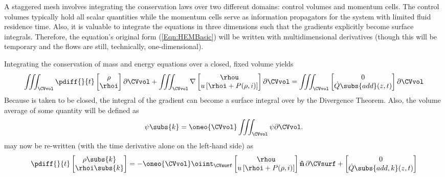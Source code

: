 A staggered mesh involves integrating the conservation laws over two different domains: control volumes and momentum cells.
The control volumes typically hold all scalar quantities while the momentum cells serve as information propagators for the system with limited fluid residence time.
Also, it is valuable to integrate the equations in three dimensions such that the gradients explicitly become surface integrals.
Therefore, the equation's original form (\cref{Eqn:HEMBasic}) will be written with multidimensional derivatives (though this will be temporary and the flows are still, technically, one-dimensional).

Integrating the conservation of mass and energy equations over a closed, fixed volume \CVvol yields
\begin{equation}
    \iiint_{\CVvol}\pdiff{}{t}\begin{bmatrix}
                   \rho \\
                   \rhoi 
                \end{bmatrix}\partial\CVvol
    + 
    \iiint_{\CVvol}\mathbf{\nabla}\begin{bmatrix}
                    \rhou                 \\
                    u\left[\rhoi  + P(\rho,i)\right]
                \end{bmatrix}\partial\CVvol
             =  
    \iiint_{\CVvol}\begin{bmatrix}
        0 \\%
        \dot{Q}\subs{add}(z,t)
    \end{bmatrix}\partial\CVvol
    \label{Eqn:HEMBasic3D}
\end{equation}
Because \CVvol is taken to be closed, the integral of the gradient can become a surface integral over \CVsurf by the Divergence Theorem.
Also, the volume average of some quantity \psi will be defined as
\begin{equation}
    \psi\subs{k} = \oneo{\CVvol}\iiint_{\CVvol}\psi \partial\CVvol.
    \label{Eqn:VolumeAveragedQuantity}
\end{equation}
 may now be re-written (with the time derivative alone on the left-hand side) as 
\begin{equation}
                \pdiff{}{t}\begin{bmatrix}
                   \rho\subs{k} \\
                   \rhoi\subs{k} 
                \end{bmatrix}
    = -  
    \oneo{\CVvol}
                \oiint_{\CVsurf}\begin{bmatrix}
                    \rhou                 \\
                    u\left[\rhoi  + P(\rho,i)\right]
                \end{bmatrix} \mathbf{\hat{n}}\,\partial\CVsurf
             +  
    \begin{bmatrix}
        0 \\%
        \dot{Q}\subs{add,k}(z,t)
    \end{bmatrix}
    \label{Eqn:HEMFVM1}
\end{equation}
